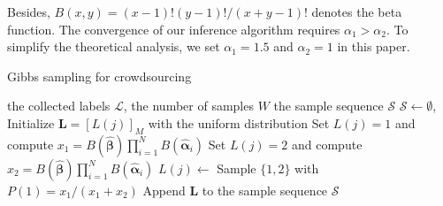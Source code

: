 Besides, $B(x,y)=(x-1)!(y-1)!/(x+y-1)!$ denotes the beta function. The convergence of our inference algorithm requires $\alpha_1>\alpha_2$.
To simplify the theoretical analysis, we set $\alpha_1=1.5$ and $\alpha_2=1$ in this paper.

\begin{algorithm}[tb]
   \caption{Gibbs sampling for crowdsourcing}
   \label{GSC}
   \small
\begin{algorithmic}[1]
   \vspace{0.5mm}
    the collected labels $\mathcal{L}$, the number of samples $W$
    the sample sequence $\mathcal{S}$
   \vspace{0.5mm}
   \STATE $\mathcal{S}\leftarrow\emptyset$, Initialize $\bm{L}=[L(j)]_M$ with the uniform distribution
   \STATE Set $L(j)=1$ and compute $x_1= B(\hat{\bm{\beta}})\prod_{i=1}^{N}B(\hat{\bm{\alpha}}_{i})$
   \STATE Set $L(j)=2$ and compute $x_2= B(\hat{\bm{\beta}})\prod_{i=1}^{N}B(\hat{\bm{\alpha}}_{i})$
   \STATE $L(j)\leftarrow$ Sample $\{1,2\}$ with $P(1)=x_1/(x_1+x_2)$
   \ENDFOR
   \STATE Append $\bm{L}$ to the sample sequence $\mathcal{S}$
   \ENDFOR
\end{algorithmic}
\end{algorithm}

